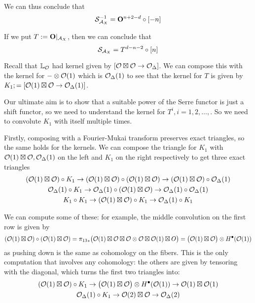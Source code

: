 We can thus conclude that $$\mathcal{S}_{\mathcal{A}_X}^{-1} = \mathbf{O}^{n+2-d}\circ [-n]$$

If we put $T:=\mathbf{O}|_{\mathcal{A}_X}$, then we can conclude that $$\mathcal{S}_{\mathcal{A}_X}=T^{d-n-2}\circ [n]$$

Recall that $\mathbb{L}_{\mathcal{O}}$ had kernel given by $[\mathcal{O} \boxtimes \mathcal{O} \rightarrow \mathcal{O}_\Delta]$. We can compose this with the kernel for $-\otimes \mathcal{O}(1)$ which is $\mathcal{O}_\Delta(1)$ to see that the kernel for $T$ is given by $K_1;=[\mathcal{O}(1)\boxtimes \mathcal{O} \rightarrow \mathcal{O}_\Delta(1)]$. 

Our ultimate aim is to show that a suitable power of the Serre functor is just a shift functor, so we need to understand the kernel for $T^i, i=1,2,\dots, $. So we need to convolute $K_1$ with itself multiple times. 


Firstly, composing with a Fourier-Mukai transform preserves exact triangles, so the same holds for the kernels. We can compose the triangle for $K_1$ with $\mathcal{O}(1)\boxtimes \mathcal{O}, \mathcal{O}_\Delta(1)$ on the left and $K_1$ on the right respectively to get three exact triangles \begin{gather*}
    (\mathcal{O}(1)\boxtimes \mathcal{O}) \circ K_1 \rightarrow (\mathcal{O}(1)\boxtimes \mathcal{O})  \circ (\mathcal{O}(1)\boxtimes \mathcal{O}) \rightarrow (\mathcal{O}(1)\boxtimes \mathcal{O}) \circ \mathcal{O}_\Delta(1)\\
    \mathcal{O}_\Delta(1)\circ K_1 \rightarrow \mathcal{O}_\Delta(1) \circ (\mathcal{O}(1)\boxtimes \mathcal{O})  \rightarrow \mathcal{O}_\Delta(1) \circ \mathcal{O}_\Delta(1)\\
    K_1 \circ K_1  \rightarrow (\mathcal{O}(1)\boxtimes \mathcal{O})\circ K_1 \rightarrow \mathcal{O}_\Delta(1)\circ K_1
\end{gather*}

We can compute some of these: for example, the middle convolution on the first row is given by $$(\mathcal{O}(1)\boxtimes \mathcal{O})  \circ (\mathcal{O}(1)\boxtimes \mathcal{O}) ={\pi_{13}}_*\big(\mathcal{O}(1)\boxtimes \mathcal{O} \boxtimes \mathcal{O} \otimes \mathcal{O} \boxtimes \mathcal{O}(1) \boxtimes O\big)=\big(\mathcal{O}(1)\boxtimes \mathcal{O}\big) \otimes H^\bullet(\mathcal{O}(1))$$
as pushing down is the same as cohomology on the fibers. This is the only computation that involves any cohomology: the others are given by tensoring with the diagonal, which turns the first two triangles into: \begin{gather*}
    (\mathcal{O}(1)\boxtimes \mathcal{O}) \circ K_1 \rightarrow \big(\mathcal{O}(1)\boxtimes \mathcal{O}\big) \otimes H^\bullet(\mathcal{O}(1)) \rightarrow \mathcal{O}(1)\boxtimes \mathcal{O}(1)\\
    \mathcal{O}_\Delta(1)\circ K_1 \rightarrow \mathcal{O}(2)\boxtimes \mathcal{O} \rightarrow \mathcal{O}_\Delta(2)
\end{gather*}

